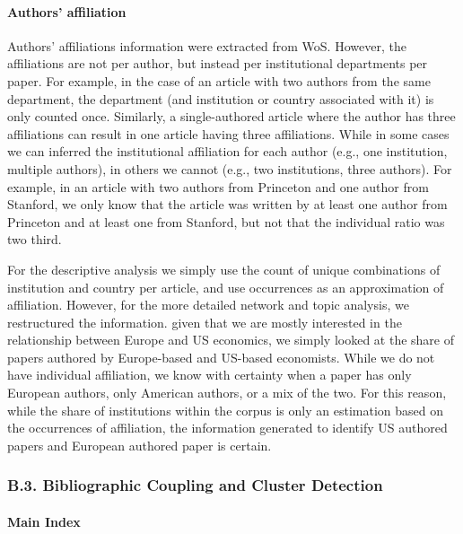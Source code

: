 \documentclass[
  12pt,
  onecolumn]{article}
\begin{document}
\hypertarget{author-affiliation}{%
\paragraph*{Authors' affiliation}\label{author-affiliation}}

Authors' affiliations information were extracted from WoS. However, the affiliations are not per author, but instead per institutional departments per paper. For example, in the case of an article with two authors from the same department, the department (and institution or country associated with it) is only counted once. Similarly, a single-authored article where the author has three affiliations can result in one article having three affiliations. While in some cases we can inferred the institutional affiliation for each author (e.g., one institution, multiple authors), in others we cannot (e.g., two institutions, three authors). For example, in an article with two authors from Princeton and one author from Stanford, we only know that the article was written by at least one author from Princeton and at least one from Stanford, but not that the individual ratio was two third.

For the descriptive analysis we simply use the count of unique combinations of institution and country per article, and use occurrences as an approximation of affiliation. However, for the more detailed network and topic analysis, we restructured the information. given that we are mostly interested in the relationship between Europe and US economics, we simply looked at the share of papers authored by Europe-based and US-based economists. While we do not have individual affiliation, we know with certainty when a paper has only European authors, only American authors, or a mix of the two. For this reason, while the share of institutions within the corpus is only an estimation based on the occurrences of affiliation, the information generated to identify US authored papers and European authored paper is certain.

\hypertarget{network}{%
\subsubsection*{B.3. Bibliographic Coupling and Cluster Detection}\label{network}}

\hypertarget{main-index}{%
\paragraph*{Main Index}\label{main-index}}
\end{document}
